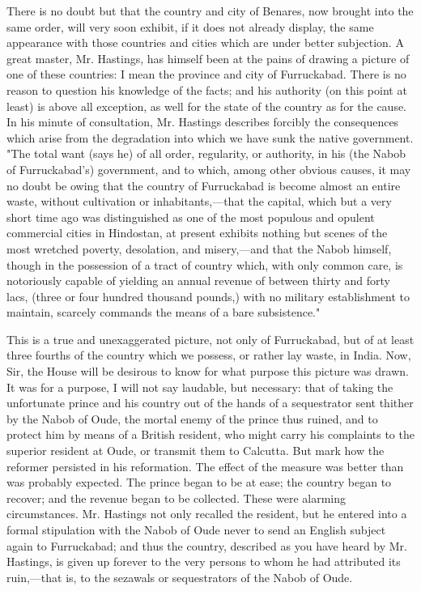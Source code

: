 There is no doubt but that the country and city of Benares, now brought into the same order, will very soon exhibit, if it does not already display, the same appearance with those countries and cities which are under better subjection. A great master, Mr. Hastings, has himself been at the pains of drawing a picture of one of these countries: I mean the province and city of Furruckabad. There is no reason to question his knowledge of the facts; and his authority (on this point at least) is above all exception, as well for the state of the country as for the cause. In his minute of consultation, Mr. Hastings describes forcibly the consequences which arise from the degradation into which we have sunk the native government. "The total want (says he) of all order, regularity, or authority, in his (the Nabob of Furruckabad's) government, and to which, among other obvious causes, it may no doubt be owing that the country of Furruckabad is become almost an entire waste, without cultivation or inhabitants,—that the capital, which but a very short time ago was distinguished as one of the most populous and opulent commercial cities in Hindostan, at present exhibits nothing but scenes of the most wretched poverty, desolation, and misery,—and that the Nabob himself, though in the possession of a tract of country which, with only common care, is notoriously capable of yielding an annual revenue of between thirty and forty lacs, (three or four hundred thousand pounds,) with no military establishment to maintain, scarcely commands the means of a bare subsistence."

This is a true and unexaggerated picture, not only of Furruckabad, but of at least three fourths of the country which we possess, or rather lay waste, in India. Now, Sir, the House will be desirous to know for what purpose this picture was drawn. It was for a purpose, I will not say laudable, but necessary: that of taking the unfortunate prince and his country out of the hands of a sequestrator sent thither by the Nabob of Oude, the mortal enemy of the prince thus ruined, and to protect him by means of a British resident, who might carry his complaints to the superior resident at Oude, or transmit them to Calcutta. But mark how the reformer persisted in his reformation. The effect of the measure was better than was probably expected. The prince began to be at ease; the country began to recover; and the revenue began to be collected. These were alarming circumstances. Mr. Hastings not only recalled the resident, but he entered into a formal stipulation with the Nabob of Oude never to send an English subject again to Furruckabad; and thus the country, described as you have heard by Mr. Hastings, is given up forever to the very persons to whom he had attributed its ruin,—that is, to the sezawals or sequestrators of the Nabob of Oude.

